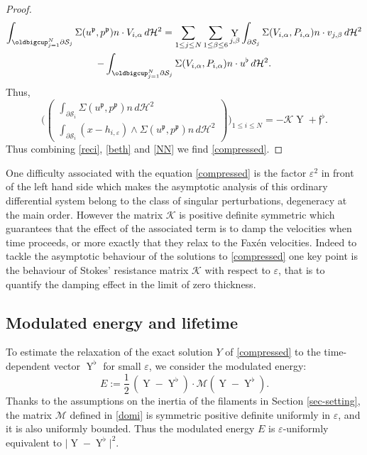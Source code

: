 \documentclass[JEP,XML,SOM,Unicode, NoEqCountersInSection,NoFloatCountersInSection,published]{cedram}
\let\eps\varepsilon
\DeclareMathOperator{\Y}{Y}
\theoremstyle{definition}
\theoremstyle{remark}
\begin{document}
\begin{proof}
\begin{multline*}
\int_{\oldbigcup_{j=1}^N \partial \mathcal S_j }
\Sigma(u^\mathfrak{p}, p^\mathfrak{p}) n \cdot V_{i,\alpha} \, d\mathcal{H}^2=
\sum_{1 \leq j \leq N} \sum_{1\leq \beta \leq 6} \Y_{j,\beta } \int_{\partial \mathcal S_j }
\Sigma(V_{i,\alpha}, P_{i,\alpha}) n \cdot v_{j,\beta} \, d\mathcal{H}^2
\\ 
-\int_{\oldbigcup_{j=1}^N \partial \mathcal S_j } \Sigma(V_{i,\alpha}, P_{i,\alpha}) n \cdot u^\flat \, d\mathcal{H}^2.
\end{multline*}
Thus,
\begin{equation}
\label{reci}
\biggl(\begin{pmatrix}
\int_{\partial \mathcal S_i } \Sigma(u^\mathfrak{p}, p^\mathfrak{p}) n \, d\mathcal{H}^2 \\
\int_{\partial \mathcal S_i} (x - h_{i,\eps}) \wedge \Sigma(u^\mathfrak{p}, p^\mathfrak{p}) n \, d\mathcal{H}^2
\end{pmatrix}\biggr)_{1 \leq i \leq N}
=
- \mathcal K \Y
+ \mathfrak{f}^\flat.
\end{equation}
Thus combining \eqref{reci}, \eqref{beth} and \eqref{NN}
we find \eqref{compressed}.
\end{proof}

One difficulty associated with the equation \eqref{compressed}
is the factor $\eps^2$ in front of the left hand side which makes the asymptotic analysis of this ordinary differential system belong to the class of singular perturbations, \ie degeneracy at the main order.
However the matrix $\mathcal K$ is positive definite symmetric which guarantees that the effect of the associated term is to damp the velocities when time proceeds, or more exactly that they relax to the Faxén velocities.
Indeed to tackle the asymptotic behaviour of the solutions to \eqref{compressed}
one key point is the behaviour of Stokes' resistance matrix $\mathcal K$ with respect to $\eps$, that is to quantify the damping effect in the limit of zero thickness.

\subsection{Modulated energy and lifetime}
\label{section-modu}

To estimate the relaxation of the exact solution $Y$ of \eqref{compressed}
to the time-dependent vector $\Y^\flat$
for small $\eps$, we consider the modulated energy:
\begin{equation}
E := \frac 1 2\, (\Y - \Y^\flat) \cdot \mathcal{M} (\Y - \Y^\flat).
\end{equation}
Thanks to the assumptions on the inertia of the filaments in
Section
\ref{sec-setting}, the matrix $\mathcal{M}$ defined in \eqref{domi} is symmetric positive definite uniformly in $\eps$, and it is also
uniformly bounded. Thus the modulated energy $E$ is $\eps$-uniformly equivalent to $\vert \Y - \Y^\flat \vert^2$.
\end{document}
